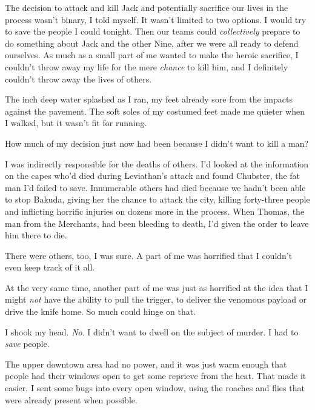 The decision to attack and kill Jack and potentially sacrifice our lives in the process wasn't binary, I told myself.  It wasn't limited to two options.  I would try to save the people I could tonight.  Then our teams could \emph{collectively} prepare to do something about Jack and the other Nine, after we were all ready to defend ourselves.  As much as a small part of me wanted to make the heroic sacrifice, I couldn't throw away my life for the mere \emph{chance }to kill him, and I definitely couldn't throw away the lives of others.



The inch deep water splashed as I ran, my feet already sore from the impacts against the pavement.  The soft soles of my costumed feet made me quieter when I walked, but it wasn't fit for running.



How much of my decision just now had been because I didn't want to kill a man?



I was indirectly responsible for the deaths of others.  I'd looked at the information on the capes who'd died during Leviathan's attack and found Chubster, the fat man I'd failed to save.  Innumerable others had died because we hadn't been able to stop Bakuda, giving her the chance to attack the city, killing forty-three people and inflicting horrific injuries on dozens more in the process.  When Thomas, the man from the Merchants, had been bleeding to death, I'd given the order to leave him there to die.



There were others, too, I was sure.  A part of me was horrified that I couldn't even keep track of it all.



At the very same time, another part of me was just as horrified at the idea that I might \emph{not} have the ability to pull the trigger, to deliver the venomous payload or drive the knife home.  So much could hinge on that.



I shook my head.  \emph{No}.  I didn't want to dwell on the subject of murder.  I had to \emph{save} people.



The upper downtown area had no power, and it was just warm enough that people had their windows open to get some reprieve from the heat.  That made it easier.  I sent some bugs into every open window, using the roaches and flies that were already present when possible.




